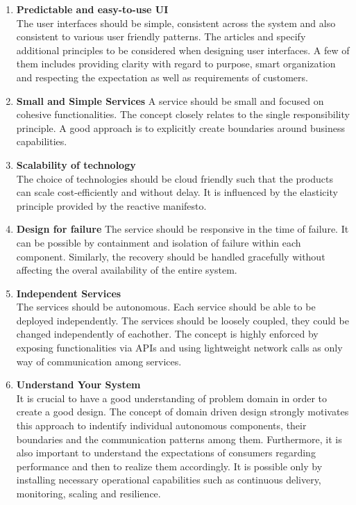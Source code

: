 \begin{enumerate}
\item \textbf{Predictable and easy-to-use UI}\\
The user interfaces should be simple, consistent across the system and also consistent to various user friendly patterns.\cite{Sollenberger:2012aa} The articles \cite{Martin:2013aa} and \cite{Porter:2016aa} specify additional principles to be considered when designing user interfaces. A few of them includes providing clarity with regard to purpose, smart organization and respecting the expectation as well as requirements of customers.
\item \textbf{Small and Simple Services}
A service should be small and focused on cohesive functionalities. The concept closely relates to the single responsibility principle. \cite{Martin:2016aa} A good approach is to explicitly create boundaries around business capabilities.\cite{Newman:2015aa}
\item \textbf{Scalability of technology}\\
The choice of technologies should be cloud friendly such that the products can scale cost-efficiently and without delay. It is influenced by the elasticity principle provided by the reactive manifesto.\cite{Boner:2014aa}
\item \textbf{Design for failure}
The service should be responsive in the time of failure. It can be possible by containment and isolation of failure within each component. Similarly, the recovery should be handled gracefully without affecting the overal availability of the entire system. \cite{Boner:2014aa}
\item \textbf{Independent Services}\\
The services should be autonomous. Each service should be able to be deployed independently. The services should be loosely coupled, they could be changed independently of eachother. The concept is highly enforced by exposing functionalities via \acrshort{API}s and using lightweight network calls as only way of communication among services. \cite{Newman:2015aa}
\item \textbf{Understand Your System}\\
It is crucial to have a good understanding of problem domain in order to create a good design. The concept of domain driven design strongly motivates this approach to indentify individual autonomous components, their boundaries and the communication patterns among them. \cite{Newman:2015aa} Furthermore, it is also important to understand the expectations of consumers regarding performance and then to realize them accordingly. It is possible only by installing necessary operational capabilities such as continuous delivery, monitoring, scaling and resilience.
\end{enumerate}
